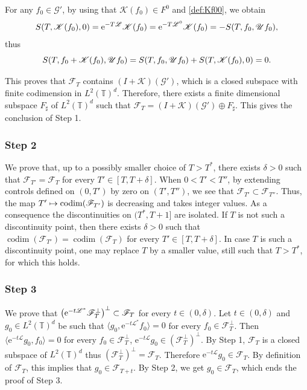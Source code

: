 \documentclass[JEP,XML,SOM,Unicode,NoEqCountersInSection]{cedram}
\let\mathcal\mathscr
\def\mto{\mathchoice{\longmapsto}{\mapsto}{\mapsto}{\mapsto}}
\theoremstyle{plain}
\theoremstyle{definition}
\theoremstyle{remark}
\DeclareMathOperator{\codim}{codim}
\newcommand{\set}{\mathbb}
\newcommand{\T}{\set{T}}
\newcommand{\eu}{\mathrm e}
\let\originalleft\left
\let\originalright\right
\renewcommand{\left}{\mathopen{}\mathclose\bgroup\originalleft}
\renewcommand{\right}{\aftergroup\egroup\originalright}
\begin{document}
For any $f_0 \in \mathcal{G}'$, by using that $\mathcal{K}(f_0) \in F^0$ and \eqref{def:Kf00}, we obtain\vspace*{-2pt}
\[
S\left(T,\mathcal{K}(f_0),0\right)=
\eu^{-T\mathcal{L}} \mathcal{K}(f_0) =
\eu^{-T\mathcal{L}^0} \mathcal{K}(f_0) =
- S(T,f_0,\mathcal{U} f_0),
\]
thus\vspace*{-3pt}
\[
S\left(T,f_0+\mathcal{K}(f_0),\mathcal{U} f_0\right)=S\left(T,f_0,\mathcal{U} f_0 \right)+ S\left(T,\mathcal{K}(f_0),0\right)=0.
\]

This proves that $\mathcal{F}_{T}$ contains $(I+\mathcal{K})(\mathcal{G}')$,
which is a closed subspace with finite codimension in $L^2(\T)^d$. Therefore, there exists a finite dimensional subspace $F_\sharp$ of $L^2(\T)^d$ such that
$\mathcal{F}_{T} = (I+\mathcal{K})(\mathcal{G}') \oplus F_\sharp$. This gives the conclusion of Step 1.

\subsubsection*{Step 2}
We prove that, up to a possibly smaller choice of $T>T^\ast$, there exists $\delta>0$ such that $\mathcal{F}_{T'}=\mathcal{F}_{T}$ for every $T'\in[T,T+\delta]$.
When $0<T'<T''$, by extending controls defined on $(0,T')$ by zero on $(T',T'')$, we see that $\mathcal{F}_{T'} \subset \mathcal{F}_{T''}$. Thus, the map $T' \mto \codim(\mathcal{F}_{T'})$ is decreasing and takes integer values. As a consequence the discontinuities on $(T^\ast,T+1]$ are isolated. If $T$ is not such a discontinuity point, then there exists $\delta>0$ such that $\codim(\mathcal{F}_{T'})=\codim(\mathcal{F}_{T})$ for every $T'\in[T,T+\delta]$. In case $T$ is such a discontinuity point, one may replace $T$ by a smaller value, still such that $T>T^\ast$, for which this holds.

\subsubsection*{Step 3}
We prove that $\left(\eu^{-t {\mathcal{L}^*}} \mathcal{F}_{T}^{\perp} \right)^\perp \subset \mathcal{F}_{T}$ for every $t\in(0,\delta)$. Let $t \in (0,\delta)$ and $g_0 \in L^2(\T)^d$ be such that $\langle g_0, \eu^{-t {\mathcal{L}^*}} f_0 \rangle = 0$ for every $f_0 \in \mathcal{F}_{T}^{\perp}$. Then $\langle \eu^{-t {\mathcal{L}}} g_0, f_0 \rangle = 0$ for every $f_0 \in \mathcal{F}_{T}^{\perp}$, \ie
$\eu^{-t {\mathcal{L}}} g_0 \in (\mathcal{F}_{T}^{\perp})^\perp$.
By Step 1, $\mathcal{F}_{T}$ is a closed subspace of $L^2(\T)^d$ thus $(\mathcal{F}_{T}^{\perp})^\perp = \mathcal{F}_{T}$. Therefore $\eu^{-t {\mathcal{L}}} g_0 \in \mathcal{F}_{T}$. By definition of $\mathcal{F}_T$, this implies that $g_0 \in \mathcal{F}_{T+t}$. By Step 2, we get $g_0 \in \mathcal{F}_T$, which ends the proof of Step 3.
\end{document}
